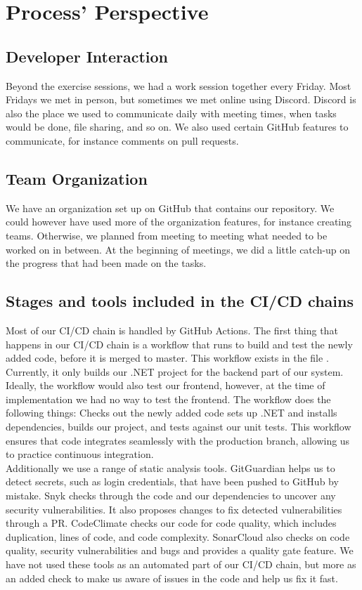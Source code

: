 \chapter{Process' Perspective}


\section{Developer Interaction}
Beyond the exercise sessions, we had a work session together every Friday. Most Fridays we met in person, but sometimes we met online using Discord. Discord is also the place we used to communicate daily with meeting times, when tasks would be done, file sharing, and so on. We also used certain GitHub features to communicate, for instance comments on pull requests.


\section{Team Organization}
We have an organization set up on GitHub that contains our repository. We could however have used more of the organization features, for instance creating teams. Otherwise, we planned from meeting to meeting what needed to be worked on in between. At the beginning of meetings, we did a little catch-up on the progress that had been made on the tasks.


\section{Stages and tools included in the \gls{CI}/\gls{CD} chains}
Most of our \gls{CI}/\gls{CD} chain is handled by GitHub Actions. The first thing that happens in our \gls{CI}/\gls{CD} chain is a workflow that runs to build and test the newly added code, before it is merged to master. This workflow exists in the file . Currently, it only builds our .NET project for the backend part of our system. Ideally, the workflow would also test our frontend, however, at the time of implementation we had no way to test the frontend. The  workflow does the following things: Checks out the newly added code sets up .NET and installs dependencies, builds our project, and tests against our unit tests. This workflow ensures that code integrates seamlessly with the production branch, allowing us to practice continuous integration.\\

Additionally we use a range of static analysis tools. GitGuardian helps us to detect secrets, such as login credentials, that have been pushed to GitHub by mistake. Snyk checks through the code and our dependencies to uncover any security vulnerabilities. It also proposes changes to fix detected vulnerabilities through a \gls{PR}. CodeClimate checks our code for code quality, which includes duplication, lines of code, and code complexity. SonarCloud also checks on code quality, security vulnerabilities and bugs and provides a quality gate feature. We have not used these tools as an automated part of our CI/CD chain, but more as an added check to make us aware of issues in the code and help us fix it fast.\\

